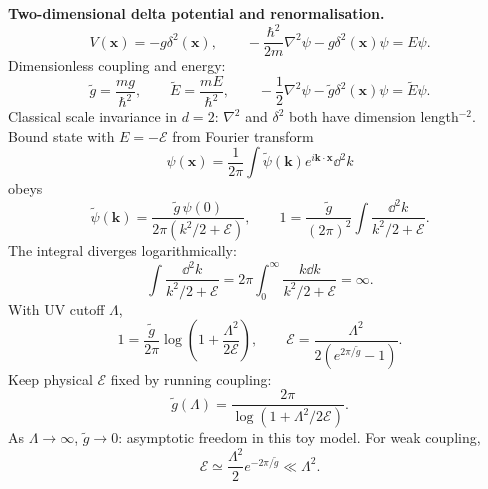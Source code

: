 \noindent\textbf{Two-dimensional delta potential and renormalisation.}
\[
V(\mathbf{x})=-g\delta^2(\mathbf{x}),\qquad
-\frac{\hbar^2}{2m}\nabla^2\psi-g\delta^2(\mathbf{x})\psi=E\psi.
\]
Dimensionless coupling and energy:
\[
\tilde g=\frac{mg}{\hbar^2},\qquad
\widetilde E=\frac{mE}{\hbar^2},\qquad
-\frac{1}{2}\nabla^2\psi-\tilde g\delta^2(\mathbf{x})\psi=\widetilde E\psi.
\]
Classical scale invariance in \(d=2\): \(\nabla^2\) and \(\delta^2\) both have
dimension length\(^{-2}\). Bound state with \(E=-\mathcal{E}\) from Fourier
transform
\[
\psi(\mathbf{x})=\frac{1}{2\pi}\int \tilde\psi(\mathbf{k})e^{i\mathbf{k}\cdot\mathbf{x}}\dd^2k
\]
obeys
\[
\tilde\psi(\mathbf{k})
=\frac{\tilde g\,\psi(0)}{2\pi(k^2/2+\mathcal{E})},\qquad
1=\frac{\tilde g}{(2\pi)^2}\int\frac{\dd^2k}{k^2/2+\mathcal{E}}.
\]
The integral diverges logarithmically:
\[
\int\frac{\dd^2k}{k^2/2+\mathcal{E}}
=2\pi\int_0^\infty\frac{k\dd k}{k^2/2+\mathcal{E}}=\infty.
\]
With UV cutoff \(\Lambda\),
\[
1=\frac{\tilde g}{2\pi}\log\!\left(1+\frac{\Lambda^2}{2\mathcal{E}}\right),
\qquad
\boxed{\mathcal{E}=\frac{\Lambda^2}{2(e^{2\pi/\tilde g}-1)}}.
\]
Keep physical \(\mathcal{E}\) fixed by running coupling:
\[
\boxed{\tilde g(\Lambda)=\frac{2\pi}{\log(1+\Lambda^2/2\mathcal{E})}}.
\]
As \(\Lambda\to\infty\), \(\tilde g\to0\): asymptotic freedom in this toy model.
For weak coupling,
\[
\mathcal{E}\simeq\frac{\Lambda^2}{2}e^{-2\pi/\tilde g}\ll\Lambda^2.
\]
